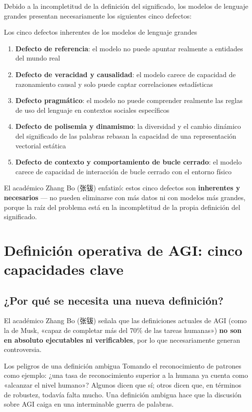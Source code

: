 \documentclass[a4paper]{article}
\begin{document}
Debido a la incompletitud de la definición del significado, los modelos de lenguaje grandes presentan necesariamente los siguientes cinco defectos:

\begin{importantbox}{Los cinco defectos inherentes de los modelos de lenguaje grandes}
\begin{enumerate}
\item \textbf{Defecto de referencia}: el modelo no puede apuntar realmente a entidades del mundo real
\item \textbf{Defecto de veracidad y causalidad}: el modelo carece de capacidad de razonamiento causal y solo puede captar correlaciones estadísticas
\item \textbf{Defecto pragmático}: el modelo no puede comprender realmente las reglas de uso del lenguaje en contextos sociales específicos
\item \textbf{Defecto de polisemia y dinamismo}: la diversidad y el cambio dinámico del significado de las palabras rebasan la capacidad de una representación vectorial estática
\item \textbf{Defecto de contexto y comportamiento de bucle cerrado}: el modelo carece de capacidad de interacción de bucle cerrado con el entorno físico
\end{enumerate}
\end{importantbox}

El académico Zhang Bo (张钹) enfatizó: estos cinco defectos son \textbf{inherentes y necesarios} — no pueden eliminarse con más datos ni con modelos más grandes, porque la raíz del problema está en la incompletitud de la propia definición del significado.

\section{Definición operativa de AGI: cinco capacidades clave}

\subsection{¿Por qué se necesita una nueva definición?}

El académico Zhang Bo (张钹) señala que las definiciones actuales de AGI (como la de Musk, «capaz de completar más del 70\% de las tareas humanas») \textbf{no son en absoluto ejecutables ni verificables}, por lo que necesariamente generan controversia.

\begin{warningbox}{Los peligros de una definición ambigua}
Tomando el reconocimiento de patrones como ejemplo: ¿una tasa de reconocimiento superior a la humana ya cuenta como «alcanzar el nivel humano»? Algunos dicen que sí; otros dicen que, en términos de robustez, todavía falta mucho. Una definición ambigua hace que la discusión sobre AGI caiga en una interminable guerra de palabras.
\end{warningbox}
\end{document}
